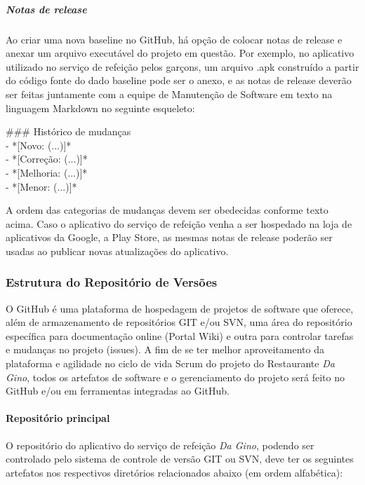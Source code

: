 \subparagraph{Notas de release}

Ao criar uma nova baseline no GitHub, há opção de colocar notas de release e anexar um arquivo executável do projeto em questão. Por exemplo, no aplicativo utilizado no serviço de refeição pelos garçons, um arquivo .apk construído a partir do código fonte do dado baseline pode ser o anexo, e as notas de release deverão ser feitas juntamente com a equipe de Manutenção de Software em texto na linguagem Markdown no seguinte esqueleto:

\begin{myprop}
\#\#\# Histórico de mudanças \\
- *[Novo: (...)]* \\
- *[Correção: (...)]* \\
- *[Melhoria: (...)]* \\
- *[Menor: (...)]* 
\end{myprop}

A ordem das categorias de mudanças devem ser obedecidas conforme texto acima. Caso o aplicativo do serviço de refeição venha a ser hospedado na loja de aplicativos da Google, a Play Store, as mesmas notas de release poderão ser usadas ao publicar novas atualizações do aplicativo.

\subsubsection{Estrutura do Repositório de Versões}

O GitHub é uma plataforma de hospedagem de projetos de software que oferece, além de armazenamento de repositórios GIT e/ou SVN, uma área do repositório específica para documentação online (Portal Wiki) e outra para controlar tarefas e mudanças no projeto (issues). A fim de se ter melhor aproveitamento da plataforma e agilidade no ciclo de vida Scrum do projeto do Restaurante \textit{Da Gino}, todos os artefatos de software e o gerenciamento do projeto será feito no GitHub e/ou em ferramentas integradas ao GitHub.

\paragraph{Repositório principal}

O repositório do aplicativo do serviço de refeição \textit{Da Gino}, podendo ser controlado pelo sistema de controle de versão GIT ou SVN, deve ter os seguintes artefatos nos respectivos diretórios relacionados abaixo (em ordem alfabética):

